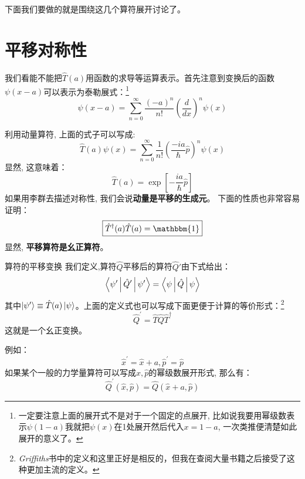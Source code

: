 \documentclass[a4paper,zihao=-4,linespread=1]{ctexrep}
\begin{document}
    下面我们要做的就是围绕这几个算符展开讨论了。
    \section{平移对称性}
    我们看能不能把$\hat{T}(a)$用函数的求导等运算表示。首先注意到变换后的函数$\psi(x-a)$可以表示为泰勒展式：\footnote{一定要注意上面的展开式不是对于一个固定的点展开, 比如说我要用幂级数表示$\psi(1-a)$我就把$\psi(x)$在1处展开然后代入$x=1-a$, 一次类推便清楚如此展开的意义了。  }
    \begin{equation}
        \label{eq:6.5}
        \psi(x-a)=\sum_{n=0}^\infty \frac{(-a)^n}{n!}\left(\frac{d}{dx}\right)^n\psi(x)
    \end{equation}
    
    
    利用动量算符, 上面的式子可以写成:
    \begin{equation}
        \hat{T}(a)\psi(x)=\sum_{n=0}^{\infty} \frac{1}{n !}\left(\frac{-i a}{\hbar} \hat{p}\right)^{n} \psi(x)
    \end{equation}
    显然, 这意味着：
    \begin{equation}
        \boxed{
            \hat{T}(a)=\exp \left[-\frac{i a}{\hbar} \hat{p}\right]
        }
    \end{equation}
    如果用李群去描述对称性, 我们会说\textbf{动量是平移的生成元}。
    下面的性质也非常容易证明：
    \begin{equation}
        \boxed{\hat{T}^\dagger(a)\hat{T}(a)=\mathbbm{1}}
    \end{equation}
    显然, \textbf{平移算符是幺正算符}。
    \begin{define}{算符的平移变换}
        我们定义,算符$\hat{Q}$平移后的算符$\hat{Q}\prime$由下式给出：
        \begin{equation}
            \Braket{\psi^\prime|\hat Q^\prime|\psi^\prime}=\Braket{\psi|\hat Q|\psi}
        \end{equation}
        其中$\ket{\psi^\prime}\equiv\hat{T}(a)\ket{\psi}$。上面的定义式也可以写成下面更便于计算的等价形式：\footnote{{\itshape Griffiths}书中的定义和这里正好是相反的，但我在查阅大量书籍之后接受了这种更加主流的定义。}
        \begin{equation}
            \boxed{\hat{Q}^{\prime}=\hat{T}\hat{Q} \hat{T}^{\dagger} }
        \end{equation}
        这就是一个幺正变换。
    \end{define}
    例如：
    $$\hat{x}^\prime=\hat x +a,\hat{p}^\prime=\hat{p}$$
    如果某个一般的力学量算符可以写成$\hat{x},\hat{p}$的幂级数展开形式, 那么有：
    \begin{equation}
        \label{eq:6.11}
        \hat{Q}^\prime(\hat x,\hat p)=\hat{Q}(\hat x+a,\hat p)
    \end{equation}
    
\end{document}
